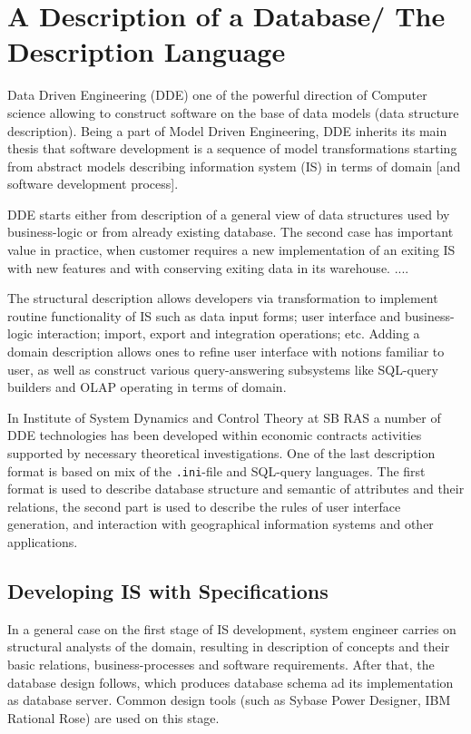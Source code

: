 \documentclass[conference]{IEEEtran}
\newcommand{\e}[2][fcolor]{\textcolor{pcolor}{[}\textcolor{#1}{#2}\textcolor{pcolor}{]}}
\begin{document}
\section{A Description of a Database/ The Description Language}
\label{sec:description-database}

Data Driven Engineering (DDE) \cite{DDE} one of the powerful direction of Computer science allowing to construct software on the base of data models (data structure description).  Being a part of Model Driven Engineering, DDE inherits its main thesis that software development is a sequence of model transformations starting from abstract models describing information system (IS) in terms of domain \e{and software development process}.

DDE starts either from description of a general view of data structures used by business-logic or from already existing database.  The second case has important value in practice, when customer requires a new implementation of an exiting IS with new features and with conserving exiting data in its warehouse.  ....

The structural description allows developers via transformation to implement routine functionality of IS such as data input forms; user interface and business-logic interaction; import, export and integration operations; etc.  Adding a domain description allows ones to refine user interface with notions familiar to user, as well as construct various query-answering subsystems like SQL-query builders and OLAP operating in terms of domain.

In Institute of System Dynamics and Control Theory at SB RAS a number of DDE technologies has been developed within economic contracts activities supported by necessary theoretical investigations.  One of the last description format is based on mix of the \texttt{.ini}-file and SQL-query languages.  The first format is used to describe database structure and semantic of attributes and their relations, the second part is used to describe the rules of user interface generation, and interaction with geographical information systems and other applications.

\subsection{Developing IS with Specifications}
\label{sec:descr-synth-stag}

In a general case on the first stage of IS development, system engineer carries on structural analysts of the domain, resulting in description of concepts and their basic relations, business-processes and software requirements.  After that, the database design follows, which produces database schema ad its implementation as database server.  Common design tools (such as Sybase Power Designer, IBM Rational Rose) are used on this stage.
\end{document}
